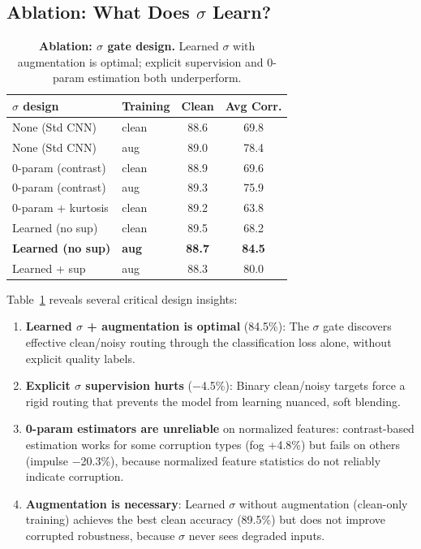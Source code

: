\documentclass[10pt,twocolumn,letterpaper]{article}
\begin{document}
\subsection{Ablation: What Does $\sigma$ Learn?}

\begin{table}[t]
\centering
\caption{\textbf{Ablation: $\sigma$ gate design.} Learned $\sigma$ with augmentation is optimal; explicit supervision and 0-param estimation both underperform.}
\label{tab:ablation}
\setlength{\tabcolsep}{3pt}
\footnotesize
\begin{tabular}{@{}llcc@{}}
\toprule
\textbf{$\sigma$ design} & \textbf{Training} & \textbf{Clean} & \textbf{Avg Corr.} \\
\midrule
None (Std CNN) & clean & 88.6 & 69.8 \\
None (Std CNN) & aug & 89.0 & 78.4 \\
\midrule
0-param (contrast) & clean & 88.9 & 69.6 \\
0-param (contrast) & aug & 89.3 & 75.9 \\
0-param + kurtosis & clean & 89.2 & 63.8 \\
\midrule
Learned (no sup) & clean & 89.5 & 68.2 \\
\textbf{Learned (no sup)} & \textbf{aug} & \textbf{88.7} & \textbf{84.5} \\
Learned + sup & aug & 88.3 & 80.0 \\
\bottomrule
\end{tabular}
\end{table}

Table~\ref{tab:ablation} reveals several critical design insights:
\begin{enumerate}
\setlength\itemsep{0pt}
\item \textbf{Learned $\sigma$ + augmentation is optimal} (84.5\%): The $\sigma$ gate discovers effective clean/noisy routing through the classification loss alone, without explicit quality labels.
\item \textbf{Explicit $\sigma$ supervision hurts} ($-$4.5\%): Binary clean/noisy targets force a rigid routing that prevents the model from learning nuanced, soft blending.
\item \textbf{0-param estimators are unreliable} on normalized features: contrast-based estimation works for some corruption types (fog +4.8\%) but fails on others (impulse $-$20.3\%), because normalized feature statistics do not reliably indicate corruption.
\item \textbf{Augmentation is necessary}: Learned $\sigma$ without augmentation (clean-only training) achieves the best clean accuracy (89.5\%) but does not improve corrupted robustness, because $\sigma$ never sees degraded inputs.
\end{enumerate}
\end{document}
